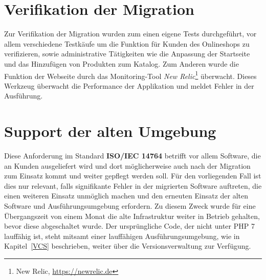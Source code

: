 \section{Verifikation der Migration}\label{newrelic}
Zur Verifikation der Migration wurden zum einen eigene Tests durchgeführt, vor allem verschiedene Testkäufe um die Funktion für Kunden des Onlineshops zu verifizieren, 
sowie administrative Tätigkeiten wie die Anpassung der Startseite und das Hinzufügen von Produkten zum Katalog. Zum Anderen wurde die Funktion der Webseite durch das 
Monitoring-Tool \textit{New Relic}\footnote{New Relic, \url{https://newrelic.de}} überwacht. Dieses Werkzeug überwacht die Performance der Applikation und meldet Fehler 
in der Ausführung.

\section{Support der alten Umgebung}
Diese Anforderung im Standard \textbf{ISO/IEC 14764} betrifft vor allem Software, die an Kunden ausgeliefert wird und dort möglicherweise auch nach der Migration 
zum Einsatz kommt und weiter gepflegt werden soll. Für den vorliegenden Fall ist dies nur relevant, falls signifikante Fehler in der migrierten Software auftreten, 
die einen weiteren Einsatz unmöglich machen und den erneuten Einsatz der alten Software und Ausführungsumgebung erfordern.
Zu diesem Zweck wurde für eine Übergangszeit von einem Monat die alte Infrastruktur weiter in Betrieb gehalten, bevor diese abgeschaltet wurde. Der ursprüngliche 
Code, der nicht unter \ac{PHP} 7 lauffähig ist, steht mitsamt einer lauffähigen Ausführungsumgebung, wie in Kapitel~\ref{VCS} beschrieben, weiter über die 
Versionsverwaltung zur Verfügung.